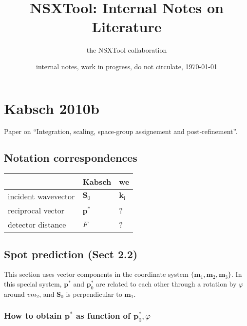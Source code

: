 \documentclass[11pt,a4paper]{article}
\def\v#1{\mathbf{#1}}
\begin{document}
\title{NSXTool: Internal Notes on Literature}
\author{the NSXTool collaboration}

\date{internal notes, work in progress, do not circulate, \today}

\maketitle

\section{Kabsch 2010b}

Paper \cite{Kab10b} on ``Integration, scaling, space-group assignement and post-refinement''.

\subsection{Notation correspondences}

\begin{tabular}{lll}
&Kabsch &we\\\hline
incident wavevector &$\v{S}_0$ &$\v{k}_\text{i}$\\
reciprocal vector &$\v{p^*}$ &?\\
detector distance &$F$ &?\\
\end{tabular}

\subsection{Spot prediction (Sect 2.2)}

This section uses vector components in the coordinate system $\{\v{m}_1,\v{m}_2,\v{m}_3\}$.
In this special system,
$\v{p}^*$ and $\v{p}^*_0$ are related to each other
through a rotation by $\varphi$ around $v{m}_2$,
and $\v{S}_0$ is perpendicular to $\v{m}_1$.

\subsubsection{How to obtain $\v{p}^*$ as function of $\v{p}^*_0,\varphi$}
\end{document}
